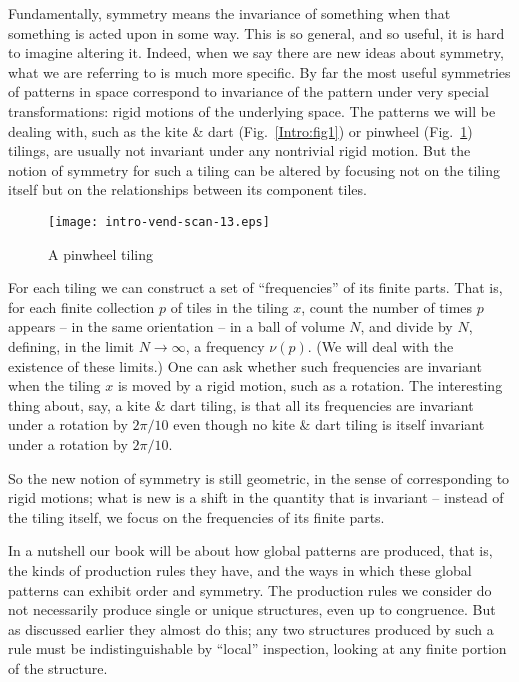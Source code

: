 \documentclass[reqno]{stml-l}
\theoremstyle{plain}
\theoremstyle{definition}
\numberwithin{equation}{chapter}
\begin{document}
Fundamentally, symmetry means the invariance of something
when that something is acted upon in some way. This is so
general, and so useful, it is hard to imagine altering it.
Indeed, when we say there are new ideas about symmetry,
what we are referring to is much more specific. By far the
most useful symmetries of patterns in space correspond to
invariance of the pattern under very special
transformations: rigid motions of the underlying space. The
patterns we will be dealing with, such as the kite \& dart
(Fig.~\ref{Intro:fig1}) or pinwheel
(Fig.~\ref{Intro:fig13}) tilings, are usually not invariant
under any nontrivial rigid motion. But the notion of
symmetry for such a tiling can be altered by focusing not
on the tiling itself but on the relationships between its
component tiles.

\begin{figure}[h]
\texttt{[image: intro-vend-scan-13.eps]}
\caption{A pinwheel tiling}
\label{Intro:fig13}
\end{figure}

For each tiling we can construct a set of ``frequencies''
of its finite parts. That is, for each finite collection
$p$ of tiles in the tiling $x$, count the number of times
$p$ appears -- in the same orientation -- in a ball of
volume $N$, and divide by $N$, defining, in the limit
$N\rightarrow\infty$, a frequency $\nu(p)$. (We will deal
with the existence of these limits.) One can ask whether
such frequencies are invariant when the tiling $x$ is moved
by a rigid motion, such as a rotation. The interesting
thing about, say, a kite \& dart tiling, is that all its
frequencies are invariant under a rotation by $2\pi/10$
even though no kite \& dart tiling is itself invariant
under a rotation by $2\pi/10$.

So the new notion of symmetry is still geometric, in the
sense of corresponding to rigid motions; what is new is a
shift in the quantity that is invariant -- instead of the
tiling itself, we focus on the frequencies of its finite
parts.

In a nutshell our book will be about how global patterns
are produced, that is, the kinds of production rules they
have, and the ways in which these global patterns can
exhibit order and symmetry. The production rules we
consider do not necessarily produce single or unique
structures, even up to congruence. But as discussed earlier
they almost do this; any two structures produced by such a
rule must be indistinguishable by ``local'' inspection,
looking at any finite portion of the structure.
\end{document}
